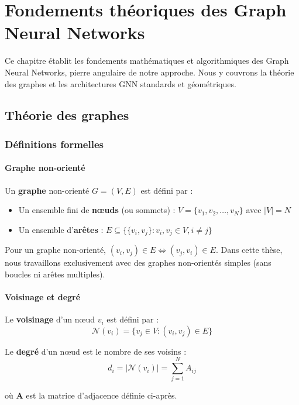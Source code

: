 
\chapter{Fondements théoriques des Graph Neural Networks}

Ce chapitre établit les fondements mathématiques et algorithmiques des Graph Neural Networks, pierre angulaire de notre approche. Nous y couvrons la théorie des graphes et les architectures GNN standards et géométriques.

\section{Théorie des graphes}

\subsection{Définitions formelles}

\subsubsection{Graphe non-orienté}

Un \textbf{graphe} non-orienté $G = (V, E)$ est défini par :
\begin{itemize}
    \item Un ensemble fini de \textbf{nœuds} (ou sommets) : $V = \{v_1, v_2, \ldots, v_N\}$ avec $|V| = N$
    \item Un ensemble d'\textbf{arêtes} : $E \subseteq \{\{v_i, v_j\} : v_i, v_j \in V, i \neq j\}$
\end{itemize}

Pour un graphe non-orienté, $(v_i, v_j) \in E \Leftrightarrow (v_j, v_i) \in E$. Dans cette thèse, nous travaillons exclusivement avec des graphes non-orientés simples (sans boucles ni arêtes multiples).

\subsubsection{Voisinage et degré}

Le \textbf{voisinage} d'un nœud $v_i$ est défini par :
\[
\mathcal{N}(v_i) = \{v_j \in V : (v_i, v_j) \in E\}
\]

Le \textbf{degré} d'un nœud est le nombre de ses voisins :
\[
d_i = |\mathcal{N}(v_i)| = \sum_{j=1}^N A_{ij}
\]

où $\mathbf{A}$ est la matrice d'adjacence définie ci-après.

